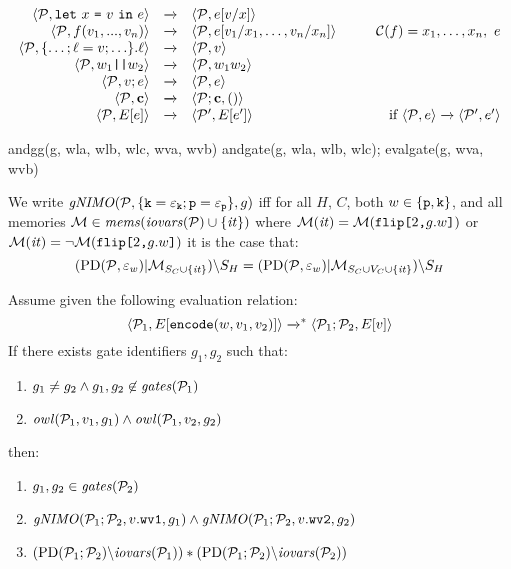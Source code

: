 $$
\begin{array}{rcl@{\hspace{10mm}}r}
\config{\prog}{\elet{x}{v}{e}} &\redx& \config{\prog}{e[v/x]}\\
\config{\prog}{f(v_1,...,v_n)} &\redx&
\config{\prog}{e[v_1/x_1,\ldots,v_n/x_n]} & 
 \codebase(f) = x_1,\ldots,x_n,\ e\\
\config{\prog}{\{\ldots; \flab = v; \ldots\}.\flab} &\redx&
 \config{\prog}{v}\\
 \config{\prog}{w_1\ttt{||}w_2} &\redx& \config{\prog}{w_1w_2}\\
 \config{\prog}{v;e} &\redx& \config{\prog}{e}\\
\config{\prog}{\instr} &\redx& \config{\prog;\instr}{()}\\
\config{\prog}{E[e]} &\redx& \config{\prog'}{E[e']} & \text{if}\ \config{\prog}{e} \redx \config{\prog'}{e'} 
\end{array}
$$

\begin{verbatimtab}
andgg(g, wla, wlb, wlc, wva, wvb) {
andgate(g, wla, wlb, wlc);
evalgate(g, wva, wvb)
}
\end{verbatimtab}

\begin{definition}
  We write $\mathit{gNIMO}(\mathcal{P},\{ \texttt{k} = \varepsilon_{\texttt{k}}; \texttt{p} = \varepsilon_{\texttt{p}}\}, g)$ iff for all $H$, $C$,
  both $w \in \{\texttt{p},\texttt{k}\}$, and all 
  memories $\mathcal{M} \in \mathit{mems}(\mathit{iovars}(\mathcal{P}) \cup \{ \mathit{it} \})$ where
  $
  \mathcal{M}(\mathit{it}) = \mathcal{M}(\texttt{flip[}2\texttt{,}g.w\texttt{]})$ or $\mathcal{M}(\mathit{it}) = \neg\mathcal{M}(\texttt{flip[}2\texttt{,}g.w\texttt{]})
  $
  it is the case that:
  $$
  (\mathrm{PD}(\mathcal{P},\varepsilon_w)|\mathcal{M}_{S_C \cup \{\mathit{it} \}})\backslash S_H =
  (\mathrm{PD}(\mathcal{P},\varepsilon_w)|\mathcal{M}_{S_C \cup V_C \cup \{\mathit{it} \}})\backslash S_H
  $$
 \end{definition}

\begin{lemma}
Assume given the following evaluation relation:
$$
\langle \mathcal{P}_1,E[\texttt{encode}(w,v_1,v_2)] \rangle \xrightarrow{}^{*} \langle \mathcal{P}_1;\mathcal{P}_2,E[v] \rangle
$$
If there exists gate identifiers $g_1, g_2$ such that:
\begin{enumerate}
  \item $g_1 \ne g_2 \wedge g_1,g_2 \not\in \mathit{gates}(\mathcal{P}_1)$
  \item $\mathit{owl}(\mathcal{P}_1,v_1,g_1) \wedge \mathit{owl}(\mathcal{P}_1,v_2,g_2)$
\end{enumerate}
then:
\begin{enumerate}
\item $g_1,g_2 \in  \mathit{gates}(\mathcal{P}_2)$
\item $\mathit{gNIMO}(\mathcal{P}_1;\mathcal{P}_2,v.\texttt{wv1},g_1) \wedge \mathit{gNIMO}(\mathcal{P}_1;\mathcal{P}_2,v.\texttt{wv2},g_2)$
\item $(\mathrm{PD}(\mathcal{P}_1;\mathcal{P}_2)\backslash\mathit{iovars}(\mathcal{P}_1)) * (\mathrm{PD}(\mathcal{P}_1;\mathcal{P}_2)\backslash\mathit{iovars}(\mathcal{P}_2))$
\end{enumerate}
\end{lemma}

